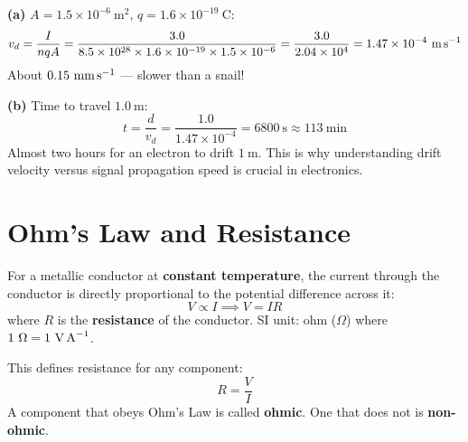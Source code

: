 \begin{solutionbox}
\textbf{(a)} $A = 1.5\times10^{-6}\ \text{m}^2$,
$q = 1.6\times10^{-19}\ \text{C}$:
\[
  v_d = \frac{I}{nqA}
  = \frac{3.0}{8.5\times10^{28}
    \times 1.6\times10^{-19}
    \times 1.5\times10^{-6}}
  = \frac{3.0}{2.04\times10^4}
  = 1.47\times10^{-4}\ \text{m\,s}^{-1}
\]
About $0.15\ \text{mm\,s}^{-1}$ --- slower than a
snail!

\textbf{(b)} Time to travel $1.0\ \text{m}$:
\[
  t = \frac{d}{v_d}
  = \frac{1.0}{1.47\times10^{-4}}
  = 6800\ \text{s} \approx 113\ \text{min}
\]
Almost two hours for an electron to drift $1\ \text{m}$.
This is why understanding drift velocity versus signal
propagation speed is crucial in electronics.
\end{solutionbox}

\section{Ohm's Law and Resistance}

\begin{lawbox}
For a metallic conductor at \textbf{constant
temperature}, the current through the conductor is
directly proportional to the potential difference
across it:
\[
  V \propto I \implies V = IR
\]
where $R$ is the \textbf{resistance} of the
conductor. SI unit: ohm ($\Omega$) where
$1\ \Omega = 1\ \text{V\,A}^{-1}$.

This defines resistance for any component:
\[
  R = \frac{V}{I}
\]
A component that obeys Ohm's Law is called
\textbf{ohmic}. One that does not is \textbf{non-ohmic}.
\end{lawbox}

